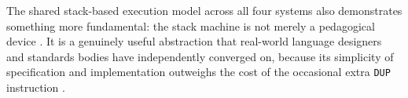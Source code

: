 The shared stack-based execution model across all four systems also demonstrates something more fundamental: the stack machine is not merely a pedagogical device \cite{VirtualMachines,StackMachineHistory}. It is a genuinely useful abstraction that real-world language designers and standards bodies have independently converged on, because its simplicity of specification and implementation outweighs the cost of the occasional extra \texttt{DUP} instruction \cite{StackVsRegister}.
